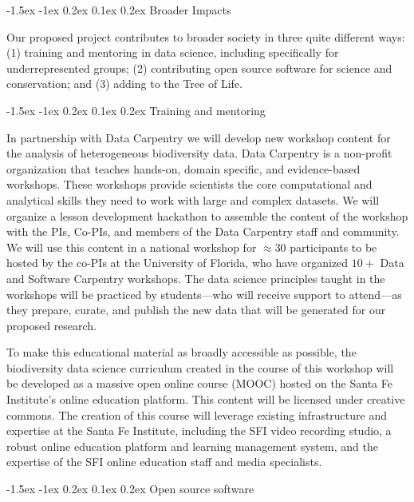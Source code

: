 \documentclass[11pt]{article}
\makeatletter
\renewcommand\section{\@startsection{section}{1}{\z@}%
                                  {-1.5ex \@plus -1ex \@minus 0.2ex}%
                                  {0.1ex \@plus 0.2ex}%
                                  {\normalfont\Large\bfseries}}
\renewcommand\subsection{\@startsection{subsection}{1}{\z@}%
                                  {-1.5ex \@plus -1ex \@minus 0.2ex}%
                                  {0.1ex \@plus 0.2ex}%
                                  {\normalfont\large\bfseries}}
\makeatother
\begin{document}
\section{Broader Impacts}\label{broader-impacts}

Our proposed project contributes to broader society in three quite
different ways: (1) training and mentoring in data science, including
specifically for underrepresented groups; (2) contributing open source
software for science and conservation; and (3) adding to the Tree of
Life.

\subsection{Training and mentoring}\label{training-and-mentoring}

In partnership with Data Carpentry we will develop new workshop
content for the analysis of heterogeneous biodiversity data. Data
Carpentry is a non-profit organization that teaches hands-on, domain
specific, and evidence-based workshops. These workshops provide
scientists the core computational and analytical skills they need to
work with large and complex datasets. We will organize a lesson
development hackathon to assemble the content of the workshop with the
PIs, Co-PIs, and members of the Data Carpentry staff and community. We
will use this content in a national workshop for $\approx 30$
participants to be hosted by the co-PIs at the University of Florida,
who have organized $10+$ Data and Software Carpentry workshops. The
data science principles taught in the workshops will be practiced by
students---who will receive support to attend---as they prepare,
curate, and publish the new data that will be generated for our
proposed research.

To make this educational material as broadly accessible as possible, the
biodiversity data science curriculum created in the course of this
workshop will be developed as a massive open online course (MOOC) hosted
on the Santa Fe Institute's online education platform. This content will
be licensed under creative commons. The creation of this course will
leverage existing infrastructure and expertise at the Santa Fe
Institute, including the SFI video recording studio, a robust online
education platform and learning management system, and the expertise of
the SFI online education staff and media specialists.

\subsection{Open source software}\label{open-source-software}
\end{document}

